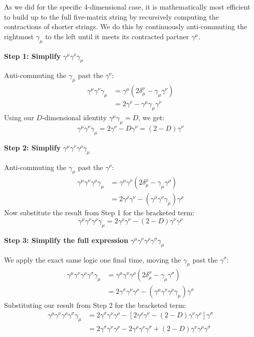 As we did for the specific 4-dimensional case, it is mathematically most efficient to build up to the full five-matrix string by recursively computing the contractions of shorter strings. We do this by continuously anti-commuting the rightmost $\gamma_\mu$ to the left until it meets its contracted partner $\gamma^\mu$.

\textbf{Step 1: Simplify } $\gamma^\mu \gamma^\nu \gamma_\mu$

Anti-commuting the $\gamma_\mu$ past the $\gamma^\nu$:
\[
    \begin{aligned}
        \gamma^\mu \gamma^\nu \gamma_\mu & = \gamma^\mu (2\delta^\nu_\mu - \gamma_\mu \gamma^\nu) \\
                                         & = 2\gamma^\nu - \gamma^\mu \gamma_\mu \gamma^\nu
    \end{aligned}
\]
Using our $D$-dimensional identity $\gamma^\mu \gamma_\mu = D$, we get:
\[
    \gamma^\mu \gamma^\nu \gamma_\mu = 2\gamma^\nu - D\gamma^\nu = (2 - D)\gamma^\nu
\]

\textbf{Step 2: Simplify } $\gamma^\mu \gamma^\nu \gamma^\rho \gamma_\mu$

Anti-commuting the $\gamma_\mu$ past the $\gamma^\rho$:
\[
    \begin{aligned}
        \gamma^\mu \gamma^\nu \gamma^\rho \gamma_\mu & = \gamma^\mu \gamma^\nu (2\delta^\rho_\mu - \gamma_\mu \gamma^\rho)        \\
                                                     & = 2\gamma^\rho \gamma^\nu - (\gamma^\mu \gamma^\nu \gamma_\mu) \gamma^\rho
    \end{aligned}
\]
Now substitute the result from Step 1 for the bracketed term:
\[
    \gamma^\mu \gamma^\nu \gamma^\rho \gamma_\mu = 2\gamma^\rho \gamma^\nu - (2 - D)\gamma^\nu \gamma^\rho
\]

\textbf{Step 3: Simplify the full expression } $\gamma^\mu \gamma^\nu \gamma^\rho \gamma^\sigma \gamma_\mu$

We apply the exact same logic one final time, moving the $\gamma_\mu$ past the $\gamma^\sigma$:
\[
    \begin{aligned}
        \gamma^\mu \gamma^\nu \gamma^\rho \gamma^\sigma \gamma_\mu & = \gamma^\mu \gamma^\nu \gamma^\rho (2\delta^\sigma_\mu - \gamma_\mu \gamma^\sigma)                    \\
                                                                   & = 2\gamma^\sigma \gamma^\nu \gamma^\rho - (\gamma^\mu \gamma^\nu \gamma^\rho \gamma_\mu) \gamma^\sigma
    \end{aligned}
\]
Substituting our result from Step 2 for the bracketed term:
\[
    \begin{aligned}
        \gamma^\mu \gamma^\nu \gamma^\rho \gamma^\sigma \gamma_\mu & = 2\gamma^\sigma \gamma^\nu \gamma^\rho - \left[ 2\gamma^\rho \gamma^\nu - (2 - D)\gamma^\nu \gamma^\rho \right] \gamma^\sigma \\
                                                                   & = 2\gamma^\sigma \gamma^\nu \gamma^\rho - 2\gamma^\rho \gamma^\nu \gamma^\sigma + (2 - D)\gamma^\nu \gamma^\rho \gamma^\sigma
    \end{aligned}
\]

